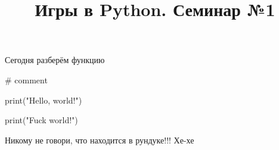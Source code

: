 \documentclass{article}
\title{Игры в Python. Семинар №1}
\author{}
\date{}
\begin{document}
\maketitle

Сегодня разберём функцию 

\begin{python}
    # comment

    print("Hello, world!")

    print("Fuck world!")
\end{python}

Никому не говори, что находится в рундуке!!! Хе-хе
\end{document}
